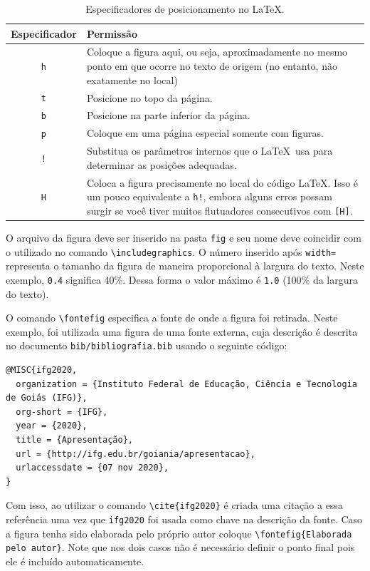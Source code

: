 \begin{table}[ht!]
\caption{Especificadores de posicionamento no \LaTeX.}
\label{tab:pos}
\begin{center}
\begin{tabular}{c|p{11.5cm}}
\hline
\textbf{Especificador} & \textbf{Permissão} \\
\hline
\verb|h| & Coloque a figura aqui, ou seja, aproximadamente no mesmo ponto em que ocorre no texto de origem (no entanto, não exatamente no local) \\
\hline
\verb|t| & Posicione no topo da página. \\
\hline
\verb|b| & Posicione na parte inferior da página. \\
\hline
\verb|p| & Coloque em uma página especial somente com figuras.\\
\hline
\verb|!| & Substitua os parâmetros internos que o \LaTeX\ usa para determinar as posições adequadas.\\
\hline
\verb|H| &  Coloca a figura precisamente no local do código \LaTeX. Isso é um pouco equivalente a \verb|h!|, embora alguns erros possam surgir se você tiver muitos flutuadores consecutivos com \verb|[H]|.\\
\hline
\end{tabular}
\end{center}
\end{table}

O arquivo da figura deve ser inserido na pasta \verb|fig| e seu nome deve coincidir com o utilizado no comando \verb|\includegraphics|. O número inserido após \verb|width=| representa o tamanho da figura de maneira proporcional à largura do texto. Neste exemplo, \verb|0.4| significa 40\%. Dessa forma o valor máximo é \verb|1.0| (100\% da largura do texto).

O comando \verb|\fontefig| especifica a fonte de onde a figura foi retirada. Neste exemplo, foi utilizada uma figura de uma fonte externa, cuja descrição é descrita no documento \verb|bib/bibliografia.bib| usando o seguinte código:

\begin{verbatim}
@MISC{ifg2020,
  organization = {Instituto Federal de Educação, Ciência e Tecnologia 
de Goiás (IFG)}, 
  org-short = {IFG},
  year = {2020},
  title = {Apresentação}, 
  url = {http://ifg.edu.br/goiania/apresentacao},
  urlaccessdate = {07 nov 2020},
}
\end{verbatim}

Com isso, ao utilizar o comando \verb|\cite{ifg2020}| é criada uma citação a essa referência uma vez que \verb|ifg2020| foi usada como chave na descrição da fonte. Caso a figura tenha sido elaborada pelo próprio autor coloque \verb|\fontefig{Elaborada pelo autor}|. Note que nos dois casos não é necessário definir o ponto final pois ele é incluído automaticamente.



